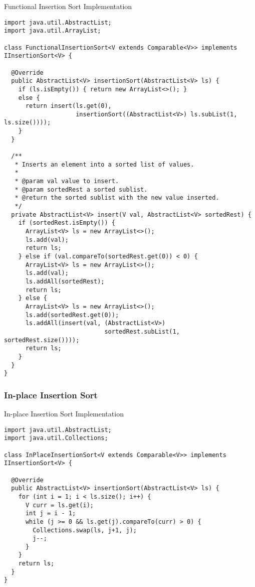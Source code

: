 \begin{cl}{Functional Insertion Sort Implementation}
\begin{lstlisting}[language=MyJava]
import java.util.AbstractList;
import java.util.ArrayList;

class FunctionalInsertionSort<V extends Comparable<V>> implements IInsertionSort<V> {
  
  @Override
  public AbstractList<V> insertionSort(AbstractList<V> ls) {
    if (ls.isEmpty()) { return new ArrayList<>(); }
    else { 
      return insert(ls.get(0), 
                    insertionSort((AbstractList<V>) ls.subList(1, ls.size()))); 
    }
  }

  /**
   * Inserts an element into a sorted list of values.
   * 
   * @param val value to insert.
   * @param sortedRest a sorted sublist.
   * @return the sorted sublist with the new value inserted.
   */
  private AbstractList<V> insert(V val, AbstractList<V> sortedRest) {
    if (sortedRest.isEmpty()) {
      ArrayList<V> ls = new ArrayList<>();
      ls.add(val);
      return ls;
    } else if (val.compareTo(sortedRest.get(0)) < 0) {
      ArrayList<V> ls = new ArrayList<>();
      ls.add(val);
      ls.addAll(sortedRest);
      return ls;
    } else {
      ArrayList<V> ls = new ArrayList<>();
      ls.add(sortedRest.get(0));
      ls.addAll(insert(val, (AbstractList<V>) 
                            sortedRest.subList(1, sortedRest.size())));
      return ls;
    }
  }
}
\end{lstlisting}
\end{cl}

\subsubsection*{In-place Insertion Sort}
\begin{cl}{In-place Insertion Sort Implementation}
\begin{lstlisting}[language=MyJava]
import java.util.AbstractList;
import java.util.Collections;

class InPlaceInsertionSort<V extends Comparable<V>> implements IInsertionSort<V> {

  @Override
  public AbstractList<V> insertionSort(AbstractList<V> ls) {
    for (int i = 1; i < ls.size(); i++) {
      V curr = ls.get(i);
      int j = i - 1;
      while (j >= 0 && ls.get(j).compareTo(curr) > 0) {
        Collections.swap(ls, j+1, j);
        j--;
      }
    }
    return ls;
  }
}
\end{lstlisting}
\end{cl}

